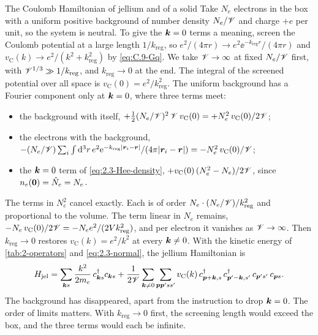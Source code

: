 \begin{workedexample}{The Coulomb Hamiltonian of jellium and of a solid}\label{we:2-jellium}
Take $N_e$ electrons in the box with a uniform positive background of number density $N_e/\mathscr{V}$ and charge $+e$ per unit, so the system is neutral. To give the $\bm{k} = 0$ terms a meaning, screen the Coulomb potential at a large length $1/k_{\mathrm{reg}}$, so $e^2/(4\pi r) \to e^2\ee^{-k_{\mathrm{reg}}r}/(4\pi r)$ and $v_{\mathrm{C}}(k) \to e^2/(k^2 + k_{\mathrm{reg}}^2)$ by \cref{eq:C.9-Gq}. We take $\mathscr{V} \to \infty$ at fixed $N_e/\mathscr{V}$ first, with $\mathscr{V}^{1/3} \gg 1/k_{\mathrm{reg}}$, and $k_{\mathrm{reg}} \to 0$ at the end. The integral of the screened potential over all space is $v_{\mathrm{C}}(0) = e^2/k_{\mathrm{reg}}^2$. The uniform background has a Fourier component only at $\bm{k} = 0$, where three terms meet:
\begin{itemize}
  \item the background with itself, $+\tfrac12(N_e/\mathscr{V})^2\,\mathscr{V}\,v_{\mathrm{C}}(0) = +N_e^2\,v_{\mathrm{C}}(0)/2\mathscr{V}$;
  \item the electrons with the background, $-(N_e/\mathscr{V})\sum_i\int\mathrm{d}^3r\,e^2\mathrm{e}^{-k_{\mathrm{reg}}|\bm{r}_i - \bm{r}|}/(4\pi|\bm{r}_i - \bm{r}|) = -N_e^2\,v_{\mathrm{C}}(0)/\mathscr{V}$;
  \item the $\bm{k} = 0$ term of \cref{eq:2.3-Hee-density}, $+v_{\mathrm{C}}(0)\,(N_e^2 - N_e)/2\mathscr{V}$, since $n_e(\bm{0}) = \hat{N}_e = N_e$.
\end{itemize}
The terms in $N_e^2$ cancel exactly. Each is of order $N_e\cdot(N_e/\mathscr{V})/k_{\mathrm{reg}}^2$ and proportional to the volume. The term linear in $N_e$ remains, $-N_e\,v_{\mathrm{C}}(0)/2\mathscr{V} = -N_e e^2/(2Vk_{\mathrm{reg}}^2)$, and per electron it vanishes as $\mathscr{V} \to \infty$. Then $k_{\mathrm{reg}} \to 0$ restores $v_{\mathrm{C}}(k) = e^2/k^2$ at every $\bm{k} \ne 0$. With the kinetic energy of \cref{tab:2-operators} and \cref{eq:2.3-normal}, the jellium Hamiltonian is~\cite[Chap.~2]{bruus2004many}
\begin{equation}
  H_{\mathrm{jel}} = \sum_{\bm{k}s}\frac{k^2}{2m_e}\,c^\dagger_{\bm{k}s}c_{\bm{k}s}
  + \frac{1}{2\mathscr{V}}\sum_{\bm{k}\ne0}\sum_{\bm{p}\bm{p}'ss'}v_{\mathrm{C}}(k)\,c^\dagger_{\bm{p}+\bm{k},s}\,c^\dagger_{\bm{p}'-\bm{k},s'}\,c_{\bm{p}'s'}\,c_{\bm{p}s} .
  \label{eq:2.3-jellium}
\end{equation}
The background has disappeared, apart from the instruction to drop $\bm{k} = 0$. The order of limits matters. With $k_{\mathrm{reg}} \to 0$ first, the screening length would exceed the box, and the three terms would each be infinite.


\end{workedexample}
